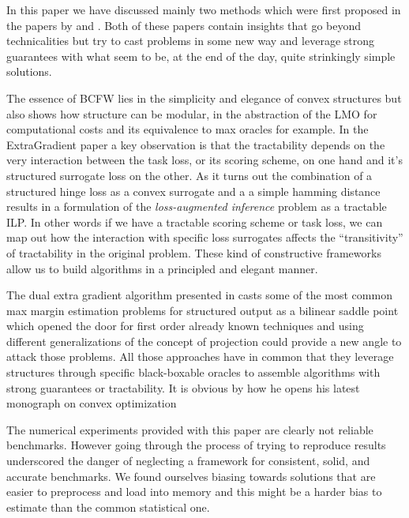 In this paper we have discussed mainly two methods which were first proposed in
the papers by \citet{taskarStructuredPredictionDual2006} and
\citet{lacoste-julienBlockCoordinateFrankWolfeOptimization2013}. Both of these
papers contain insights that go beyond technicalities but try to cast problems
in some new way and leverage strong guarantees with what seem to be, at the end
of the day, quite strinkingly simple solutions.

The essence of BCFW lies in the simplicity and elegance of convex structures but
also shows how structure can be modular, in the abstraction of the LMO for
computational costs and its equivalence to max oracles for example. In the
ExtraGradient paper a key observation is that the tractability depends on the
very interaction between the task loss, or its scoring scheme, on one hand and
it's structured surrogate loss on the other. As it turns out the combination of
a structured hinge loss as a convex surrogate and a a simple hamming distance
results in a formulation of the \emph{loss-augmented inference} problem as a
tractable ILP. In other words if we have a tractable scoring scheme or task
loss, we can map out how the interaction with specific loss surrogates
affects the ``transitivity'' of tractability in the original problem.
These kind of constructive frameworks allow us to build algorithms in a
principled and elegant manner. 

The dual extra gradient algorithm presented in
\cite{taskarStructuredPredictionDual2006} casts some of the most common max
margin estimation problems for structured output as a bilinear saddle point
which opened the door for first order already known techniques and using
different generalizations of the concept of projection could provide a new angle
to attack those problems. All those approaches have in common that they leverage
structures through specific black-boxable oracles to assemble algorithms with
strong guarantees or tractability. It is obvious by how he opens his latest
monograph on convex optimization \citeet


The numerical experiments provided with this paper are clearly not reliable
benchmarks. However going through the process of trying to reproduce results
underscored the danger of neglecting a framework for consistent, solid, and
accurate benchmarks. We found ourselves biasing towards solutions that are
easier to preprocess and load into memory and this might be a harder bias to
estimate than the common statistical one.
